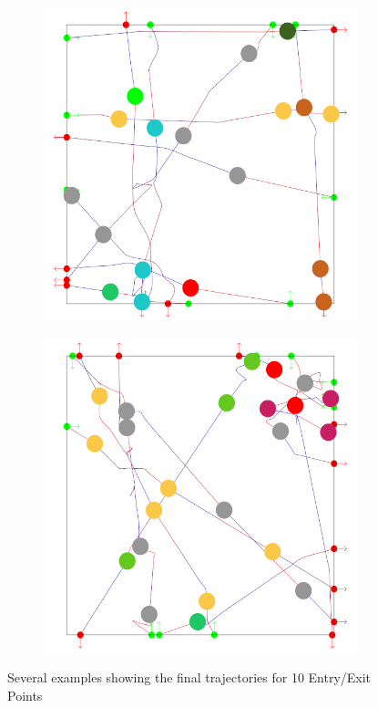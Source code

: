 \begin{figure}[t]
\begin{subfigure}[b]{0.24\linewidth}
 	\caption{}
 \end{subfigure}
 \begin{subfigure}[b]{0.24\linewidth}
 	\includegraphics[width=\linewidth]{images/res-10-withAgents_3.png}
 	\caption{}
 \end{subfigure}
 \begin{subfigure}[b]{0.24\linewidth}
 	\includegraphics[width=\linewidth]{images/res-10-withAgents_4.png}
 	\caption{}
 \end{subfigure}
 \caption{Several examples showing the final trajectories for 10 Entry/Exit Points}
 \label{fig:res:ten}
\end{figure}

